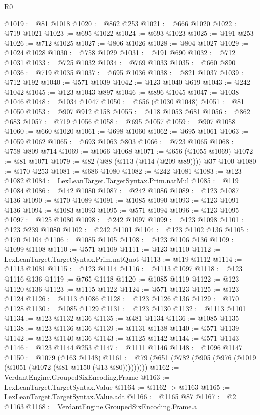\begin{lexlean}{R0}
\begin{coremodule}
@1019 := @81 @1018
@1020 := @862 @253
@1021 := @666 @1020
@1022 := @719 @1021
@1023 := @695 @1022
@1024 := @693 @1023
@1025 := @191 @253
@1026 := @712 @1025
@1027 := @806 @1026
@1028 := @804 @1027
@1029 := @1024 @1028
@1030 := @758 @1029
@1031 := @191 @690
@1032 := @712 @1031
@1033 := @725 @1032
@1034 := @769 @1033
@1035 := @660 @890
@1036 := @719 @1035
@1037 := @695 @1036
@1038 := @821 @1037
@1039 := @712 @192
@1040 := @571 @1039
@1042 := @123 @1040 @619
@1043 := @242 @1042
@1045 := @123 @1043 @897
@1046 := @896 @1045
@1047 := @1038 @1046
@1048 := @1034 @1047
@1050 := @656 (@1030 @1048)
@1051 := @81 @1050
@1053 := @907 @912 @158
@1055 := @118 @1053 @681
@1056 := @862 @683
@1057 := @719 @1056
@1058 := @695 @1057
@1059 := @907 @1058
@1060 := @660 @1020
@1061 := @698 @1060
@1062 := @695 @1061
@1063 := @1059 @1062
@1065 := @693 @1063 @803
@1066 := @723 @1065
@1068 := @758 @809 @714
@1069 := @1066 @1068
@1071 := @656 (@1055 @1069)
@1072 := @81 @1071
@1079 := @82 (@88 (@113 (@114 (@209 @89)))) @37 @100
@1080 := @170 @253
@1081 := @686 @1080
@1082 := @242 @1081
@1083 := @123 @1082
@1084 := LexLeanTarget.TargetSyntax.Prim.natMul
@1085 := @119 @1084
@1086 := @142 @1080
@1087 := @242 @1086
@1089 := @123 @1087 @136
@1090 := @170 @1089
@1091 := @1085 @1090
@1093 := @123 @1091 @136
@1094 := @1083 @1093
@1095 := @571 @1094
@1096 := @123 @1095
@1097 := @125 @1080
@1098 := @242 @1097
@1099 := @123 @1098
@1101 := @123 @239 @1080
@1102 := @242 @1101
@1104 := @123 @1102 @136
@1105 := @170 @1104
@1106 := @1085 @1105
@1108 := @123 @1106 @136
@1109 := @1099 @1108
@1110 := @571 @1109
@1111 := @123 @1110
@1112 := LexLeanTarget.TargetSyntax.Prim.natQuot
@1113 := @119 @1112
@1114 := @1113 @1081
@1115 := @123 @1114
@1116 := @1113 @1097
@1118 := @123 @1116 @136
@1119 := @765 @1118
@1120 := @1085 @1119
@1122 := @123 @1120 @136
@1123 := @1115 @1122
@1124 := @571 @1123
@1125 := @123 @1124
@1126 := @1113 @1086
@1128 := @123 @1126 @136
@1129 := @170 @1128
@1130 := @1085 @1129
@1131 := @123 @1130
@1132 := @1113 @1101
@1134 := @123 @1132 @136
@1135 := @481 @1134
@1136 := @1085 @1135
@1138 := @123 @1136 @136
@1139 := @1131 @1138
@1140 := @571 @1139
@1142 := @123 @1140 @136
@1143 := @1125 @1142
@1144 := @571 @1143
@1146 := @123 @1144 @253
@1147 := @1111 @1146
@1148 := @1096 @1147
@1150 := @1079 (@163 @1148)
@1161 := @79 (@651 (@782 (@905 (@976 (@1019 (@1051 (@1072 (@81 @1150 (@13 @80)))))))))
@1162 := VerdantEngine.GroupedSixEncoding.Frame
@1163 := LexLeanTarget.TargetSyntax.Value
@1164 := @1162 -> @1163
@1165 := LexLeanTarget.TargetSyntax.Value.adt
@1166 := @1165 @87
@1167 := @2 @1163
@1168 := VerdantEngine.GroupedSixEncoding.Frame.a

\end{coremodule}
\end{lexlean}
